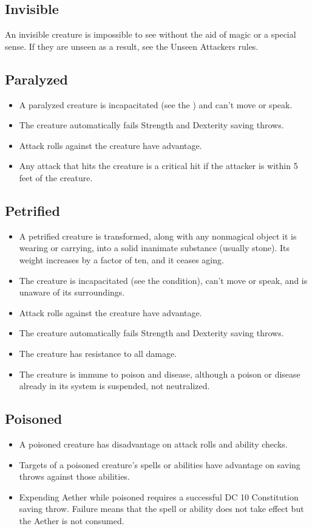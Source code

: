 \subsection{Invisible\label{condition:invisible}}
An invisible creature is impossible to see without the aid of magic or a special sense. If they are unseen as a result, see the Unseen Attackers rules. 

\subsection{Paralyzed\label{condition:paralyzed}}
\begin{itemize}
\item A paralyzed creature is incapacitated (see the ) and can't move or speak.
\item The creature automatically fails Strength and Dexterity saving throws.
\item Attack rolls against the creature have advantage.
\item Any attack that hits the creature is a critical hit if the attacker is within 5 feet of the creature.
\end{itemize}

\subsection{Petrified\label{condition:petrified}}
\begin{itemize}
\item A petrified creature is transformed, along with any nonmagical object it is wearing or carrying, into a solid inanimate substance (usually stone). Its weight increases by a factor of ten, and it ceases aging.
\item The creature is incapacitated (see the condition), can't move or speak, and is unaware of its surroundings.
\item Attack rolls against the creature have advantage.
\item The creature automatically fails Strength and Dexterity saving throws.
\item The creature has resistance to all damage.
\item The creature is immune to poison and disease, although a poison or disease already in its system is suspended, not neutralized.
\end{itemize}

\subsection{Poisoned\label{condition:poisoned}}
\begin{itemize}
\item A poisoned creature has disadvantage on attack rolls and ability checks.
\item Targets of a poisoned creature's spells or abilities have advantage on saving throws against those abilities.
\item Expending Aether while poisoned requires a successful DC 10 Constitution saving throw. Failure means that the spell or ability does not take effect but the Aether is not consumed. 
\end{itemize}

